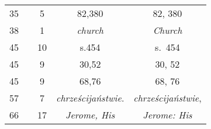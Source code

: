 \documentclass[a4paper,11pt]{article}
\numberwithin{equation}{section}
\begin{document}
\begin{center}
\begin{tabular}{|c|c|c|c|c|}
    \hphantom{0}35 & & \hphantom{0}5 & 82,380 & 82, 380 \\
    \hphantom{0}38 & & \hphantom{0}1 & \textit{church} & \textit{Church} \\
    \hphantom{0}45 & & 10 & s.454 & s.~454 \\
    \hphantom{0}45 & & \hphantom{0}9 & 30,52 & 30, 52 \\
    \hphantom{0}45 & & \hphantom{0}9 & 68,76 & 68, 76 \\
    \hphantom{0}57 & & \hphantom{0}7 & \textit{chrześcijaństwie}.
    & \textit{chrześcijaństwie}, \\
    \hphantom{0}66 & & 17 & \textit{Jerome, His} & \textit{Jerome: His} \\
    \hline
  \end{tabular}





  \newpage


\end{center}
\end{document}
